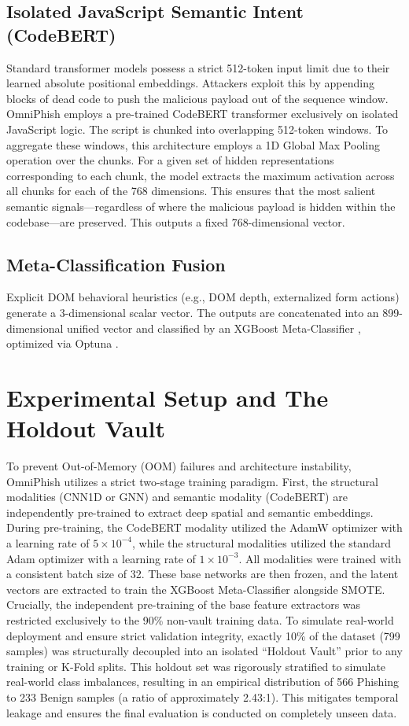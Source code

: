 \documentclass[conference]{IEEEtran}
\begin{document}
\subsection{Isolated JavaScript Semantic Intent (CodeBERT)}
Standard transformer models \cite{devlin_bert} possess a strict 512-token input limit due to their learned absolute positional embeddings. Attackers exploit this by appending blocks of dead code to push the malicious payload out of the sequence window. OmniPhish employs a pre-trained CodeBERT transformer \cite{codebert} exclusively on isolated JavaScript logic. The script is chunked into overlapping 512-token windows. To aggregate these windows, this architecture employs a 1D Global Max Pooling operation over the chunks. For a given set of hidden representations corresponding to each chunk, the model extracts the maximum activation across all chunks for each of the 768 dimensions. This ensures that the most salient semantic signals—regardless of where the malicious payload is hidden within the codebase—are preserved. This outputs a fixed 768-dimensional vector.

\subsection{Meta-Classification Fusion}
Explicit DOM behavioral heuristics (e.g., DOM depth, externalized form actions) generate a 3-dimensional scalar vector. The outputs are concatenated into an 899-dimensional unified vector and classified by an XGBoost Meta-Classifier \cite{xgboost}, optimized via Optuna \cite{optuna}.

\section{Experimental Setup and The Holdout Vault}
To prevent Out-of-Memory (OOM) failures and architecture instability, OmniPhish utilizes a strict two-stage training paradigm. First, the structural modalities (CNN1D or GNN) and semantic modality (CodeBERT) are independently pre-trained to extract deep spatial and semantic embeddings. During pre-training, the CodeBERT modality utilized the AdamW optimizer \cite{adamw} with a learning rate of $5 \times 10^{-4}$, while the structural modalities utilized the standard Adam optimizer with a learning rate of $1 \times 10^{-3}$. All modalities were trained with a consistent batch size of 32. These base networks are then frozen, and the latent vectors are extracted to train the XGBoost Meta-Classifier alongside SMOTE. Crucially, the independent pre-training of the base feature extractors was restricted exclusively to the 90\% non-vault training data. To simulate real-world deployment and ensure strict validation integrity, exactly 10\% of the dataset (799 samples) was structurally decoupled into an isolated ``Holdout Vault'' prior to any training or K-Fold splits. This holdout set was rigorously stratified to simulate real-world class imbalances, resulting in an empirical distribution of 566 Phishing to 233 Benign samples (a ratio of approximately 2.43:1). This mitigates temporal leakage and ensures the final evaluation is conducted on completely unseen data.
\end{document}
